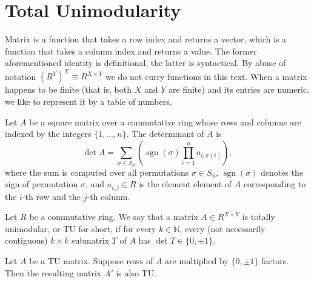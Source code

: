 \section{Total Unimodularity}

\begin{definition}
    \label{Matrix}
    \leanok
    Matrix is a function that takes a row index and returns a vector, which is a function that takes a column index and returns a value.
    The former aforementioned identity is definitional, the latter is syntactical.
    By abuse of notation $\left(R^Y\right)^X \equiv R^{X \times Y}$ we do not curry functions in this text.
    When a matrix happens to be finite (that is, both $X$ and $Y$ are finite) and its entries are numeric, we like to represent it by a table of numbers.
\end{definition}

\begin{definition}
    \label{Matrix.det}
    \leanok
    Let $A$ be a square matrix over a commutative ring whose rows and columns are indexed by the integers $\{1, \dots, n\}$.
    The determinant of $A$ is
    \[
        \det A = \sum_{\sigma \in S_{n}} \left( \operatorname{sgn}(\sigma) \prod_{i = 1}^{n} a_{i, \sigma(i)} \right),
    \]
    where the sum is computed over all permutations $\sigma \in S_{n}$, $\operatorname{sgn}(\sigma)$ denotes the sign of permutation $\sigma$,
    and $a_{i,j} \in R$ is the element element of $A$ corresponding to the $i$-th row and the $j$-th column.
\end{definition}

\begin{definition}
    \label{Matrix.IsTotallyUnimodular}
    \leanok
    Let $R$ be a commutative ring. We say that a matrix $A \in R^{X \times Y}$ is totally unimodular, or TU for short, if for every $k \in \mathbb{N}$, every (not necessarily contiguous) $k \times k$ submatrix $T$ of $A$ has $\det T \in \{0, \pm 1\}$.
\end{definition}

\begin{lemma}
    \label{Matrix.IsTotallyUnimodular.mul_rows}
    \leanok
    Let $A$ be a TU matrix. Suppose rows of $A$ are multiplied by $\{0, \pm 1\}$ factors. Then the resulting matrix $A'$ is also TU.
\end{lemma}


